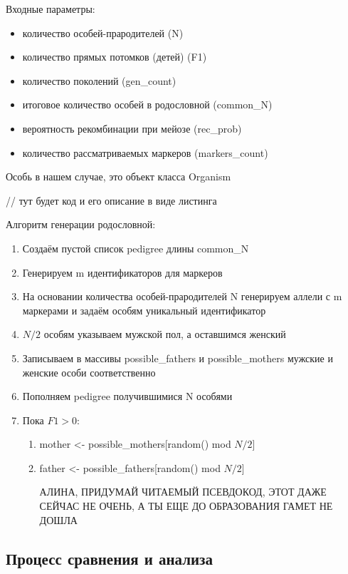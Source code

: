 \documentclass{matmex-diploma-custom}
\begin{document}
Входные параметры:
\begin{itemize}
\item количество особей-прародителей (N)
\item количество прямых потомков (детей) (F1)
\item количество поколений (gen\_count)
\item итоговое количество особей в родословной (common\_N)
\item вероятность рекомбинации при мейозе (rec\_prob)
\item количество рассматриваемых маркеров (markers\_count)
\end{itemize}

Особь в нашем случае, это объект класса Organism

// тут будет код и его описание в виде листинга

Алгоритм генерации родословной:
\begin{enumerate}
\item Создаём пустой список pedigree длины common\_N
\item Генерируем m идентификаторов для маркеров
\item На основании количества особей-прародителей N генерируем аллели
  с m маркерами и задаём особям уникальный идентификатор
\item $N / 2$ особям указываем мужской пол, а оставшимся женский
\item Записываем в массивы possible\_fathers и possible\_mothers
  мужские и женские особи соответственно
\item Пополняем pedigree получившимися N особями
\item Пока $F1 > 0$:
  \begin{enumerate}
  \item mother <- possible\_mothers[random() mod $N / 2$]
  \item father <- possible\_fathers[random() mod $N / 2$]

АЛИНА, ПРИДУМАЙ ЧИТАЕМЫЙ ПСЕВДОКОД, ЭТОТ ДАЖЕ СЕЙЧАС НЕ ОЧЕНЬ, А ТЫ
ЕЩЕ ДО ОБРАЗОВАНИЯ ГАМЕТ НЕ ДОШЛА

  \end{enumerate}

\end{enumerate}

\subsection{Процесс сравнения и анализа}
\end{document}
